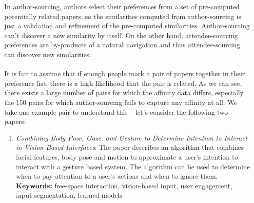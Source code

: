 \documentclass[letterpaper]{article}
\begin{document}
\begin{enumerate}
\begin{enumerate}
\end{enumerate}
In author-sourcing, authors select their preferences from a set of pre-computed potentially related papers, so the similarities computed from author-sourcing is just a validation and refinement of the pre-computed similarities. Author-sourcing can't discover a new similarity by itself. On the other hand, attendee-sourcing preferences are by-products of a natural navigation and thus attendee-sourcing can discover new similarities.
\\
\\
It is fair to assume that if enough people mark a pair of papers together in their preference list, there is a high likelihood that the pair is related. As we can see, there exists a large number of pairs for which the affinity data differs, especially the 150 pairs for which author-sourcing fails to capture any affinity at all. We take one example pair to understand this -- let's consider the following two papers:
\begin{enumerate}
\item \emph{Combining Body Pose, Gaze, and Gesture to Determine Intention to Interact in Vision-Based Interfaces}: The paper describes an algorithm that combines facial features, body pose and motion to approximate a user's intention to interact with a gesture based system. The algorithm can be used to determine when to pay attention to a user's actions and when to ignore them. \textbf{Keywords:} free-space interaction, vision-based input, user engagement, input segmentation, learned models



\end{enumerate}
\end{enumerate}
\end{document}

